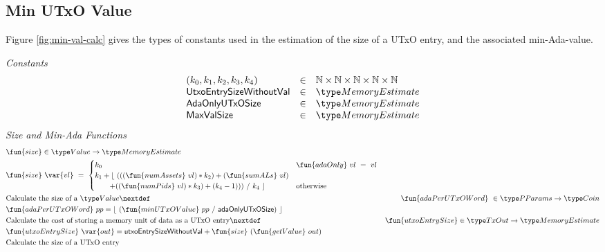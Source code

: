 \subsection{Min UTxO Value}
\label{sec:min-value}

Figure \ref{fig:min-val-calc} gives the types of constants used in the estimation
of the size of a UTxO entry, and the associated min-Ada-value.

\begin{figure*}[h]
  \emph{Constants}
  \begin{equation*}
    \begin{array}{lcl}
      (k_0, k_1, k_2, k_3, k_4) & \in & \N \times \N \times \N \times \N \times \N \\
      \mathsf{UtxoEntrySizeWithoutVal} & \in & \MemoryEstimate \\
      \mathsf{AdaOnlyUTxOSize} & \in & \MemoryEstimate \\
      \mathsf{MaxValSize} & \in & \MemoryEstimate \\
    \end{array}
  \end{equation*}
  \emph{Size and Min-Ada Functions}
  \begin{align*}
    & \fun{size} \in \Value \to \MemoryEstimate \\
    & \fun{size}~\var{vl} ~=~
    \begin{cases}
      k_0 & \fun{adaOnly}~vl~=~vl \\
      k_1 + \lfloor~ (((\fun{numAssets}~vl) * k_2) + (\fun{sumALs}~vl) & \\
      ~~~~~~ + ((\fun{numPids}~vl) * k_3) + (k_4 - 1)))~ /~ k_4~\rfloor & \text{otherwise} \\
    \end{cases} \\
    & \text{Calculate the size of a $\Value$}
    \nextdef
    & \fun{adaPerUTxOWord}~\in \PParams \to \Coin \\
    & \fun{adaPerUTxOWord}~pp = \lfloor~ (\fun{minUTxOValue}~pp~/~ \mathsf{adaOnlyUTxOSize})~ \rfloor \\
    & \text{Calculate the cost of storing a memory unit of data as a UTxO entry}
    \nextdef
    & \fun{utxoEntrySize} \in \TxOut \to \MemoryEstimate \\
    & \fun{utxoEntrySize}~\var{out} = \mathsf{utxoEntrySizeWithoutVal} + \fun{size}~ (\fun{getValue}~out) \\
    & \text{Calculate the size of a UTxO entry}
\end{align*}
\caption{Value Size}
\label{fig:min-val-calc}
\end{figure*}

